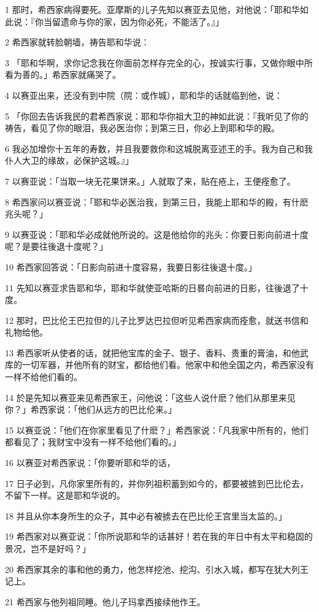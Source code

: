 \par 1 那时，希西家病得要死。亚摩斯的儿子先知以赛亚去见他，对他说：「耶和华如此说：『你当留遗命与你的家，因为你必死，不能活了。』」
\par 2 希西家就转脸朝墙，祷告耶和华说：
\par 3 「耶和华啊，求你记念我在你面前怎样存完全的心，按诚实行事，又做你眼中所看为善的。」希西家就痛哭了。
\par 4 以赛亚出来，还没有到中院（院：或作城），耶和华的话就临到他，说：
\par 5 「你回去告诉我民的君希西家说：耶和华你祖大卫的神如此说：『我听见了你的祷告，看见了你的眼泪，我必医治你；到第三日，你必上到耶和华的殿。
\par 6 我必加增你十五年的寿数，并且我要救你和这城脱离亚述王的手。我为自己和我仆人大卫的缘故，必保护这城。』」
\par 7 以赛亚说：「当取一块无花果饼来。」人就取了来，贴在疮上，王便痊愈了。
\par 8 希西家问以赛亚说：「耶和华必医治我，到第三日，我能上耶和华的殿，有什麽兆头呢？」
\par 9 以赛亚说：「耶和华必成就他所说的。这是他给你的兆头：你要日影向前进十度呢？是要往後退十度呢？」
\par 10 希西家回答说：「日影向前进十度容易，我要日影往後退十度。」
\par 11 先知以赛亚求告耶和华，耶和华就使亚哈斯的日晷向前进的日影，往後退了十度。
\par 12 那时，巴比伦王巴拉但的儿子比罗达巴拉但听见希西家病而痊愈，就送书信和礼物给他。
\par 13 希西家听从使者的话，就把他宝库的金子、银子、香料、贵重的膏油，和他武库的一切军器，并他所有的财宝，都给他们看。他家中和他全国之内，希西家没有一样不给他们看的。
\par 14 於是先知以赛亚来见希西家王，问他说：「这些人说什麽？他们从那里来见你？」希西家说：「他们从远方的巴比伦来。」
\par 15 以赛亚说：「他们在你家里看见了什麽？」希西家说：「凡我家中所有的，他们都看见了；我财宝中没有一样不给他们看的。」
\par 16 以赛亚对希西家说：「你要听耶和华的话，
\par 17 日子必到，凡你家里所有的，并你列祖积蓄到如今的，都要被掳到巴比伦去，不留下一样。这是耶和华说的。
\par 18 并且从你本身所生的众子，其中必有被掳去在巴比伦王宫里当太监的。」
\par 19 希西家对以赛亚说：「你所说耶和华的话甚好！若在我的年日中有太平和稳固的景况，岂不是好吗？」
\par 20 希西家其余的事和他的勇力，他怎样挖池、挖沟、引水入城，都写在犹大列王记上。
\par 21 希西家与他列祖同睡。他儿子玛拿西接续他作王。

